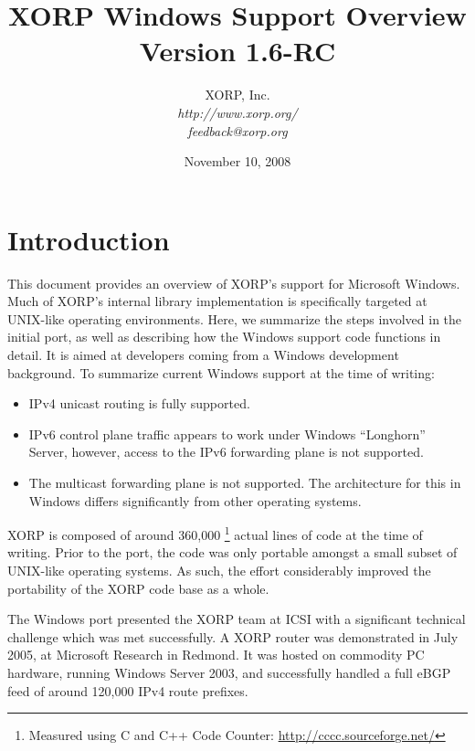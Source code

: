 \documentclass[11pt]{article}
\begin{document}
\title{XORP Windows Support Overview \\
\vspace{1ex}
Version 1.6-RC}
\author{ XORP, Inc.					\\
         {\it http://www.xorp.org/}			\\
	 {\it feedback@xorp.org}
}
\date{November 10, 2008}

\maketitle


\section{Introduction}

This document provides an overview of XORP's support for Microsoft Windows.
Much of XORP's internal library implementation is specifically targeted
at UNIX-like operating environments. Here, we summarize the steps involved
in the initial port, as well as describing how the Windows support code
functions in detail. It is aimed at developers coming from a Windows
development background.
To summarize current Windows support at the time of writing:
\begin{itemize}
 \item IPv4 unicast routing is fully supported.
 \item IPv6 control plane traffic appears to work under Windows
``Longhorn'' Server, however, access to the IPv6 forwarding plane
is not supported.
 \item The multicast forwarding plane is not supported. The architecture
for this in Windows differs significantly from other operating systems.
\end{itemize}

XORP is composed of around 360,000
\footnote{Measured using C and C++ Code Counter: \url{http://cccc.sourceforge.net/}}
actual lines of code at the time of writing.
Prior to the port, the code was only portable amongst
a small subset of UNIX-like operating systems. As such, the effort
considerably improved the portability of the XORP code base as a whole.

The Windows port presented the XORP team at ICSI with a significant technical
challenge which was met successfully.
A XORP router  was
demonstrated in July 2005, at Microsoft Research in Redmond.
It was hosted on commodity PC hardware, running Windows Server 2003,
and successfully handled a full eBGP feed of around 120,000 IPv4 route prefixes.
\end{document}
